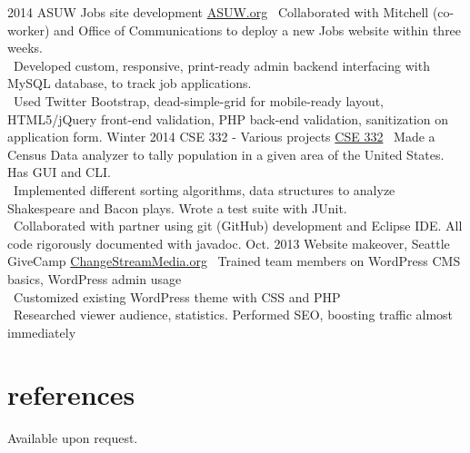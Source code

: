 \documentclass[]{friggeri-cv}
\begin{document}
\begin{entrylist}
  \entry
    {2014}
    {ASUW Jobs site development}
    {\href{http://jobs.asuw.org}{ASUW.org}}
    {\bullet \, Collaborated with Mitchell (co-worker) and Office of Communications to deploy a new Jobs website within three weeks. \\
    \bullet \, Developed custom, responsive, print-ready admin backend interfacing with MySQL database, to track job applications. \\
    \bullet \, Used Twitter Bootstrap, dead-simple-grid for mobile-ready layout, HTML5/jQuery front-end validation, PHP back-end validation, sanitization on application form.
    }
  \entry
    {Winter 2014}
    {CSE 332 - Various projects}
    {\href{http://cs.washington.edu/332}{CSE 332}}
    {\bullet \, Made a Census Data analyzer to tally population in a given area of the United States. Has GUI and CLI. \\
    \bullet \, Implemented different sorting algorithms, data structures to analyze Shakespeare and Bacon plays. Wrote a test suite with JUnit. \\
    \bullet \, Collaborated with partner using git (GitHub) development and Eclipse IDE. All code rigorously documented with javadoc.}
  \entry
    {Oct. 2013}
    {Website makeover, Seattle GiveCamp}
    {\href{http://changestreammedia.org}{ChangeStreamMedia.org}}
    {\bullet \, Trained team members on WordPress CMS basics, WordPress admin usage \\
    \bullet \, Customized existing WordPress theme with CSS and PHP \\
    \bullet \, Researched viewer audience, statistics. Performed SEO, boosting traffic almost immediately}
\end{entrylist}

\section{references}

Available upon request.
\end{document}
